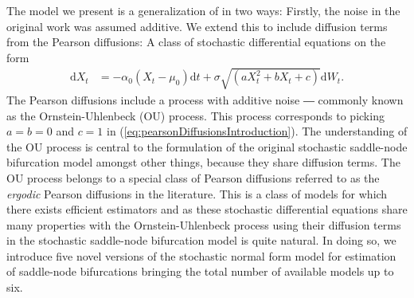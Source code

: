 The model we present is a generalization of \cite[equation (1)]{Ditlevsen2023} in two ways: Firstly, the noise in the original work was assumed additive. We extend this to include diffusion terms from the Pearson diffusions: A class of stochastic differential equations on the form
\begin{align}
    \mathrm{d}X_t &= -\alpha_0\left(X_t - \mu_0\right)\mathrm{d}t + \sigma\sqrt{\left(aX_t^2 + bX_t + c\right)}\mathrm{d}W_t. \label{eq:pearsonDiffusionsIntroduction}
\end{align}
The Pearson diffusions include a process with additive noise ― commonly known as the Ornstein-Uhlenbeck (OU) process. This process corresponds to picking $a = b = 0$ and $c = 1$ in (\ref{eq:pearsonDiffusionsIntroduction}). The understanding of the OU process is central to the formulation of the original stochastic saddle-node bifurcation model amongst other things, because they share diffusion terms. The OU process belongs to a special class of Pearson diffusions referred to as the \textit{ergodic} Pearson diffusions in the literature. This is a class of models for which there exists efficient estimators and as these stochastic differential equations share many properties with the Ornstein-Uhlenbeck process using their diffusion terms in the stochastic saddle-node bifurcation model is quite natural. In doing so, we introduce five novel versions of the stochastic normal form model for estimation of saddle-node bifurcations bringing the total number of available models up to six.

